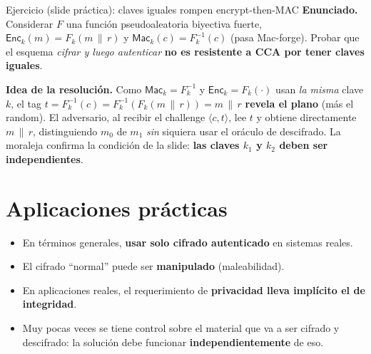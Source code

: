 \documentclass[11pt,a4paper]{article}
\newcommand{\concat}{\,\|\,}
\newcommand{\Mac}{\mathsf{Mac}}
\newcommand{\Enc}{\mathsf{Enc}}
\begin{document}
\begin{practbox}{Ejercicio (slide práctica): claves iguales rompen encrypt-then-MAC}
\textbf{Enunciado.} Considerar $F$ una función pseudoaleatoria biyectiva fuerte,
$\Enc_k(m)=F_k(m\concat r)$ y $\Mac_k(c)=F^{-1}_k(c)$ (pasa Mac-forge). Probar que el esquema
\emph{cifrar y luego autenticar} \textbf{no es resistente a CCA por tener claves iguales}.

\medskip
\textbf{Idea de la resolución.} Como $\Mac_k=F^{-1}_k$ y $\Enc_k=F_k(\cdot)$ usan
\emph{la misma} clave $k$, el tag $t=F^{-1}_k(c)=F^{-1}_k(F_k(m\concat r))=m\concat r$
\textbf{revela el plano} (más el random). El adversario, al recibir el challenge
$\langle c,t\rangle$, lee $t$ y obtiene directamente $m\concat r$, distinguiendo $m_0$ de
$m_1$ \emph{sin} siquiera usar el oráculo de descifrado. La moraleja confirma la condición de
la slide: \textbf{las claves $k_1$ y $k_2$ deben ser independientes}.
\end{practbox}

\section{Aplicaciones prácticas}

\begin{slidebox}
\begin{itemize}[leftmargin=1.3em,itemsep=2pt]
  \item En términos generales, \textbf{usar solo cifrado autenticado} en sistemas reales.
  \item El cifrado ``normal'' puede ser \textbf{manipulado} (maleabilidad).
  \item En aplicaciones reales, el requerimiento de \textbf{privacidad lleva implícito el de
        integridad}.
  \item Muy pocas veces se tiene control sobre el material que va a ser cifrado y descifrado:
        la solución debe funcionar \textbf{independientemente} de eso.
\end{itemize}
\end{slidebox}

\end{document}
